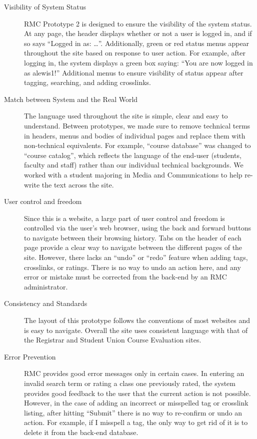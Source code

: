 \documentclass[12pt]{report}
\begin{document}
\begin{description}
\item[Visibility of System Status] RMC Prototype 2 is designed to ensure the visibility of the system status. At any page, the header displays whether or not a user is logged in, and if so says “Logged in as: …”. Additionally, green or red status menus appear throughout the site based on response to user action. For example, after logging in, the system displays a green box saying: “You are now logged in as alewis1!” Additional menus to ensure visibility of status appear after tagging, searching, and adding crosslinks.
\item[Match between System and the Real World] The language used throughout the site is simple, clear and easy to understand. Between prototypes, we made sure to remove technical terms in headers, menus and bodies of individual pages and replace them with non-technical equivalents. For example, “course database” was changed to “course catalog”, which reflects the language of the end-user (students, faculty and staff) rather than our individual technical backgrounds. We worked with a student majoring in Media and Communications to help re-write the text across the site.
\item[User control and freedom] Since this is a website, a large part of user control and freedom is controlled via the user’s web browser, using the back and forward buttons to navigate between their browsing history. Tabs on the header of each page provide a clear way to navigate between the different pages of the site. However, there lacks an “undo” or “redo” feature when adding tags, crosslinks, or ratings. There is no way to undo an action here, and any error or mistake must be corrected from the back-end by an RMC administrator.
\item[Consistency and Standards] The layout of this prototype follows the conventions of most websites and is easy to navigate.  Overall the site uses consistent language with that of the Registrar and Student Union Course Evaluation sites.
\item[Error Prevention] RMC provides good error messages only in certain cases. In entering an invalid search term or rating a class one previously rated, the system provides good feedback to the user that the current action is not possible. However, in the case of adding an incorrect or misspelled tag or crosslink listing, after hitting “Submit” there is no way to re-confirm or undo an action. For example, if I misspell a tag, the only way to get rid of it is to delete it from the back-end database.

\end{description}
\end{document}
